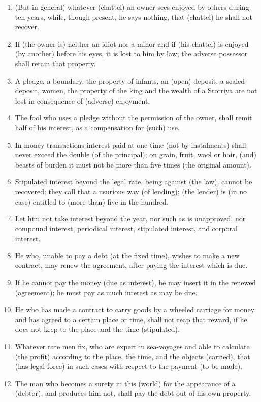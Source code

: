 \begin{enumerate}
\item (But in general) whatever (chattel) an owner sees enjoyed by others during ten years, while, though present, he says nothing, that (chattel) he shall not recover.
\item If (the owner is) neither an idiot nor a minor and if (his chattel) is enjoyed (by another) before his eyes, it is lost to him by law; the adverse possessor shall retain that property.
\item A pledge, a boundary, the property of infants, an (open) deposit, a sealed deposit, women, the property of the king and the wealth of a Srotriya are not lost in consequence of (adverse) enjoyment.
\item The fool who uses a pledge without the permission of the owner, shall remit half of his interest, as a compensation for (such) use.
\item In money transactions interest paid at one time (not by instalments) shall never exceed the double (of the principal); on grain, fruit, wool or hair, (and) beasts of burden it must not be more than five times (the original amount).
\item Stipulated interest beyond the legal rate, being against (the law), cannot be recovered; they call that a usurious way (of lending); (the lender) is (in no case) entitled to (more than) five in the hundred.
\item Let him not take interest beyond the year, nor such as is unapproved, nor compound interest, periodical interest, stipulated interest, and corporal interest.
\item He who, unable to pay a debt (at the fixed time), wishes to make a new contract, may renew the agreement, after paying the interest which is due.
\item If he cannot pay the money (due as interest), he may insert it in the renewed (agreement); he must pay as much interest as may be due.
\item He who has made a contract to carry goods by a wheeled carriage for money and has agreed to a certain place or time, shall not reap that reward, if he does not keep to the place and the time (stipulated).
\item Whatever rate men fix, who are expert in sea-voyages and able to calculate (the profit) according to the place, the time, and the objects (carried), that (has legal force) in such cases with respect to the payment (to be made).
\item The man who becomes a surety in this (world) for the appearance of a (debtor), and produces him not, shall pay the debt out of his own property.

\end{enumerate}
